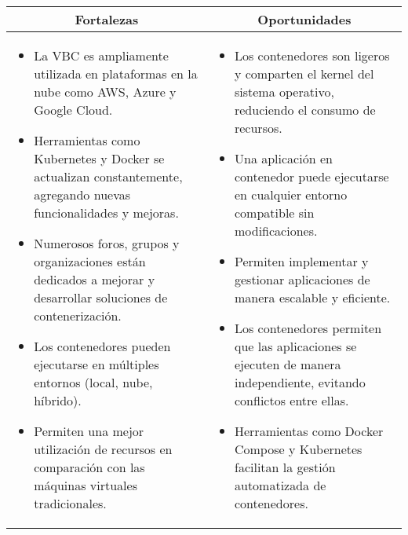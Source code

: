 \begin{table}[H]
\centering
\scriptsize
\setlength{\tabcolsep}{4pt}
\renewcommand{\arraystretch}{1.2}
\begin{tabularx}{\textwidth}{|X|X|}
\hline
\multicolumn{1}{|c|}{\textbf{Fortalezas}} & \multicolumn{1}{c|}{\textbf{Oportunidades}} \\
\hline
\begin{minipage}[t]{\linewidth}
\vspace{2pt}
\begin{itemize}
    \setlength\itemsep{0pt}
    \setlength\parskip{0pt}
    \setlength\parsep{0pt}
    \item La VBC es ampliamente utilizada en plataformas en la nube como AWS, Azure y Google Cloud.
    \item Herramientas como Kubernetes y Docker se actualizan constantemente, agregando nuevas funcionalidades y mejoras.
    \item Numerosos foros, grupos y organizaciones están dedicados a mejorar y desarrollar soluciones de contenerización.
    \item Los contenedores pueden ejecutarse en múltiples entornos (local, nube, híbrido).
    \item Permiten una mejor utilización de recursos en comparación con las máquinas virtuales tradicionales.
\end{itemize}
\vspace{2pt}
\end{minipage}
&
\begin{minipage}[t]{\linewidth}
\vspace{2pt}
\begin{itemize}
    \setlength\itemsep{0pt}
    \setlength\parskip{0pt}
    \setlength\parsep{0pt}
    \item Los contenedores son ligeros y comparten el kernel del sistema operativo, reduciendo el consumo de recursos.
    \item Una aplicación en contenedor puede ejecutarse en cualquier entorno compatible sin modificaciones.
    \item Permiten implementar y gestionar aplicaciones de manera escalable y eficiente.
    \item Los contenedores permiten que las aplicaciones se ejecuten de manera independiente, evitando conflictos entre ellas.
    \item Herramientas como Docker Compose y Kubernetes facilitan la gestión automatizada de contenedores.
\end{itemize}

\end{minipage}
\end{tabularx}
\end{table}
